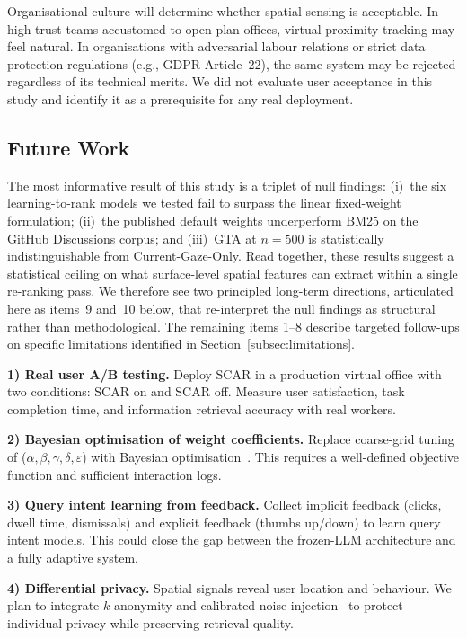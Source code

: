 \documentclass[journal]{IEEEtran}
\begin{document}
Organisational culture will determine whether spatial sensing is acceptable. In high-trust teams accustomed to open-plan offices, virtual proximity tracking may feel natural. In organisations with adversarial labour relations or strict data protection regulations (e.g., GDPR Article~22), the same system may be rejected regardless of its technical merits. We did not evaluate user acceptance in this study and identify it as a prerequisite for any real deployment.

\subsection{Future Work}
\label{subsec:future_work}

The most informative result of this study is a triplet of null findings:
(i)~the six learning-to-rank models we tested fail to surpass the linear
fixed-weight formulation; (ii)~the published default weights underperform
BM25 on the GitHub Discussions corpus; and (iii)~GTA at $n{=}500$ is
statistically indistinguishable from Current-Gaze-Only.
Read together, these results suggest a statistical ceiling on what
surface-level spatial features can extract within a single re-ranking pass.
We therefore see two principled long-term directions, articulated here as
items~9 and~10 below, that re-interpret the null findings as structural
rather than methodological. The remaining items 1--8 describe targeted
follow-ups on specific limitations identified in
Section~\ref{subsec:limitations}.

\textbf{1) Real user A/B testing.}
Deploy SCAR in a production virtual office with two conditions: SCAR on and SCAR off.
Measure user satisfaction, task completion time, and information retrieval accuracy with real workers.

\textbf{2) Bayesian optimisation of weight coefficients.}
Replace coarse-grid tuning of ($\alpha, \beta, \gamma, \delta, \varepsilon$) with Bayesian optimisation~\cite{bayesopt}.
This requires a well-defined objective function and sufficient interaction logs.

\textbf{3) Query intent learning from feedback.}
Collect implicit feedback (clicks, dwell time, dismissals) and explicit feedback (thumbs up/down) to learn query intent models.
This could close the gap between the frozen-LLM architecture and a fully adaptive system.

\textbf{4) Differential privacy.}
Spatial signals reveal user location and behaviour.
We plan to integrate $k$-anonymity and calibrated noise injection~\cite{diffprivacy} to protect individual privacy while preserving retrieval quality.
\end{document}
